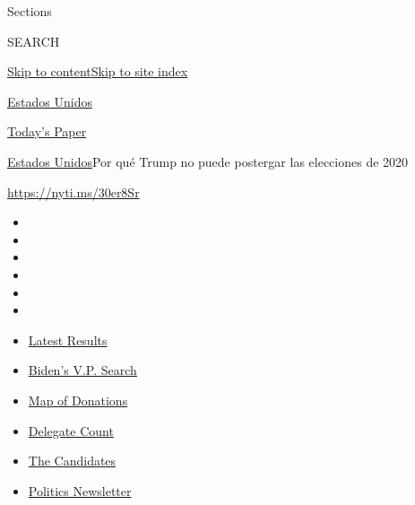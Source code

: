 Sections

SEARCH

\protect\hyperlink{site-content}{Skip to
content}\protect\hyperlink{site-index}{Skip to site index}

\href{https://www.nytimes3xbfgragh.onion/es/section/estados-unidos}{Estados
Unidos}

\href{https://myaccount.nytimes3xbfgragh.onion/auth/login?response_type=cookie\&client_id=vi}{}

\href{https://www.nytimes3xbfgragh.onion/section/todayspaper}{Today's
Paper}

\href{/es/section/estados-unidos}{Estados Unidos}\textbar{}Por qué Trump
no puede postergar las elecciones de 2020

\url{https://nyti.ms/30er8Sr}

\begin{itemize}
\item
\item
\item
\item
\item
\item
\end{itemize}

\begin{itemize}
\item
  \href{https://www.nytimes3xbfgragh.onion/interactive/2020/08/04/us/elections/results-arizona-kansas-michigan-missouri-primaries.html?action=click\&pgtype=Article\&state=default\&region=TOP_BANNER\&context=storylines_menu}{Latest
  Results}
\item
  \href{https://www.nytimes3xbfgragh.onion/article/biden-vice-president-2020.html?action=click\&pgtype=Article\&state=default\&region=TOP_BANNER\&context=storylines_menu}{Biden's
  V.P. Search}
\item
  \href{https://www.nytimes3xbfgragh.onion/interactive/2020/07/24/us/politics/trump-biden-campaign-donors.html?action=click\&pgtype=Article\&state=default\&region=TOP_BANNER\&context=storylines_menu}{Map
  of Donations}
\item
  \href{https://www.nytimes3xbfgragh.onion/interactive/2020/us/elections/delegate-count-primary-results.html?action=click\&pgtype=Article\&state=default\&region=TOP_BANNER\&context=storylines_menu}{Delegate
  Count}
\item
  \href{https://www.nytimes3xbfgragh.onion/interactive/2019/us/politics/2020-presidential-candidates.html?action=click\&pgtype=Article\&state=default\&region=TOP_BANNER\&context=storylines_menu}{The
  Candidates}
\item
  \href{https://www.nytimes3xbfgragh.onion/newsletters/politics?action=click\&pgtype=Article\&state=default\&region=TOP_BANNER\&context=storylines_menu}{Politics
  Newsletter}
\end{itemize}

